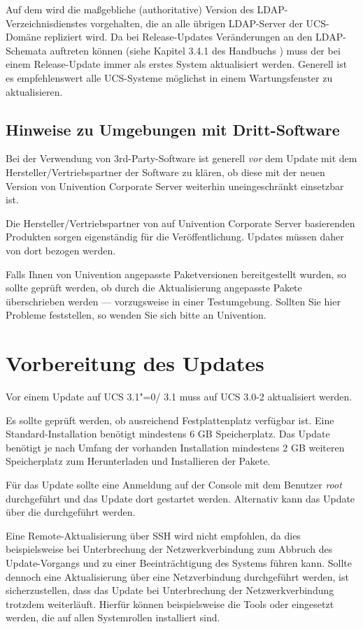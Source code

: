 Auf dem \ucsMaster{} wird die maßgebliche (authoritative) Version des
LDAP-Verzeichnisdienstes vorgehalten, die an alle übrigen LDAP-Server
der UCS-Domäne repliziert wird. Da bei Release-Updates Veränderungen
an den LDAP-Schemata auftreten können (siehe
Kapitel 3.4.1 des Handbuchs \cite{UCS-Handbuch}) muss der \ucsMaster{} bei einem
Release-Update immer als erstes System aktualisiert werden.
Generell ist es empfehlenswert alle UCS-Systeme möglichst in einem
Wartungsfenster zu aktualisieren. 

\section{Hinweise zu Umgebungen mit Dritt-Software}

Bei der Verwendung von 3rd-Party-Software ist generell \emph{vor} dem Update
mit dem Hersteller/Vertriebspartner der Software zu klären, ob
diese mit der neuen Version von Univention Corporate Server weiterhin
uneingeschränkt einsetzbar ist. 

Die Hersteller/Vertriebspartner von auf Univention Corporate Server
basierenden Produkten sorgen eigenständig für die Veröffentlichung. Updates
müssen daher von dort bezogen werden.

Falls Ihnen von Univention angepasste Paketversionen bereitgestellt wurden, so
sollte geprüft werden, ob durch die Aktualisierung angepasste Pakete
überschrieben werden --- vorzugsweise in einer Testumgebung. Sollten Sie hier
Probleme feststellen, so wenden Sie sich bitte an Univention.

\chapter{Vorbereitung des Updates}
Vor einem Update auf UCS 3.1"=0/\ucsUAS{} 3.1 muss auf UCS 3.0-2 aktualisiert werden.

Es sollte geprüft werden, ob ausreichend Festplattenplatz verfügbar ist. Eine
Standard-Installation benötigt mindestens 6 GB Speicherplatz. Das
Update benötigt je nach Umfang der vorhanden Installation mindestens 2 GB
weiteren Speicherplatz zum Herunterladen und Installieren der Pakete.

Für das Update sollte eine Anmeldung auf der Console mit dem
Benutzer \emph{root} durchgeführt und das Update dort gestartet werden.
Alternativ kann das Update über die \ucsUMC{} durchgeführt werden.

Eine Remote-Aktualisierung über SSH wird nicht empfohlen, da dies
beispielsweise bei Unterbrechung der Netzwerkverbindung zum Abbruch des
Update-Vorgangs und zu einer Beeinträchtigung des Systems führen kann. Sollte
dennoch eine Aktualisierung über eine Netzverbindung durchgeführt werden, ist
sicherzustellen, dass das Update bei Unterbrechung der Netzwerkverbindung trotzdem
weiterläuft. Hierfür können beispielsweise die Tools  oder
 eingesetzt werden, die auf allen Systemrollen installiert sind.



